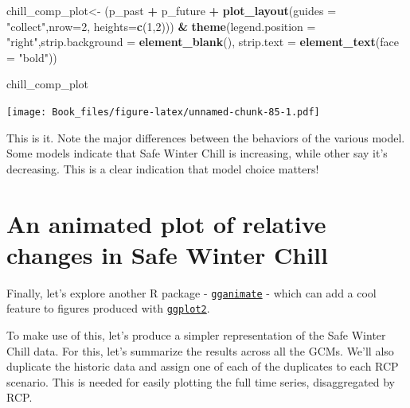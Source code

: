 \documentclass[
]{book}
\newenvironment{Shaded}{\begin{snugshade}}{\end{snugshade}}
\newcommand{\DataTypeTok}[1]{\textcolor[rgb]{0.13,0.29,0.53}{#1}}
\newcommand{\DecValTok}[1]{\textcolor[rgb]{0.00,0.00,0.81}{#1}}
\newcommand{\KeywordTok}[1]{\textcolor[rgb]{0.13,0.29,0.53}{\textbf{#1}}}
\newcommand{\NormalTok}[1]{#1}
\newcommand{\OperatorTok}[1]{\textcolor[rgb]{0.81,0.36,0.00}{\textbf{#1}}}
\newcommand{\StringTok}[1]{\textcolor[rgb]{0.31,0.60,0.02}{#1}}
\begin{document}
\begin{Shaded}
\begin{Highlighting}[]
\NormalTok{chill_comp_plot<-}
\StringTok{  }\NormalTok{(p_past }\OperatorTok{+}
\StringTok{     }\NormalTok{p_future }\OperatorTok{+}
\StringTok{     }\KeywordTok{plot_layout}\NormalTok{(}\DataTypeTok{guides =} \StringTok{"collect"}\NormalTok{,}\DataTypeTok{nrow=}\DecValTok{2}\NormalTok{, }\DataTypeTok{heights=}\KeywordTok{c}\NormalTok{(}\DecValTok{1}\NormalTok{,}\DecValTok{2}\NormalTok{))) }\OperatorTok{&}
\StringTok{  }\KeywordTok{theme}\NormalTok{(}\DataTypeTok{legend.position =} \StringTok{"right"}\NormalTok{,}\DataTypeTok{strip.background =} \KeywordTok{element_blank}\NormalTok{(),}
        \DataTypeTok{strip.text =} \KeywordTok{element_text}\NormalTok{(}\DataTypeTok{face =} \StringTok{"bold"}\NormalTok{))}

\NormalTok{chill_comp_plot}
\end{Highlighting}
\end{Shaded}

\texttt{[image: Book\_files/figure-latex/unnamed-chunk-85-1.pdf]}

This is it. Note the major differences between the behaviors of the various model. Some models indicate that Safe Winter Chill is increasing, while other say it's decreasing. This is a clear indication that model choice matters!

\hypertarget{an-animated-plot-of-relative-changes-in-safe-winter-chill}{%
\section{An animated plot of relative changes in Safe Winter Chill}\label{an-animated-plot-of-relative-changes-in-safe-winter-chill}}

Finally, let's explore another R package - \href{https://cran.r-project.org/web/packages/gganimate/gganimate.pdf}{\texttt{gganimate}} - which can add a cool feature to figures produced with \href{https://cran.r-project.org/web/packages/ggplot2/ggplot2.pdf}{\texttt{ggplot2}}.

To make use of this, let's produce a simpler representation of the Safe Winter Chill data. For this, let's summarize the results across all the GCMs. We'll also duplicate the historic data and assign one of each of the duplicates to each RCP scenario. This is needed for easily plotting the full time series, disaggregated by RCP.
\end{document}

